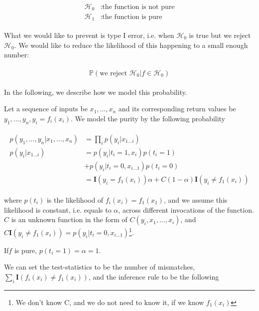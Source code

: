 \documentclass[]{article}
\begin{document}
\begin{align}
    \begin{split}    
    \mathcal{H}_0&: \text{the function is not pure} \\
    \mathcal{H}_1&: \text{the function is pure}
    \end{split}
\end{align}

What we would like to prevent is type I error, i.e. when $\mathcal{H}_0$ is 
true but we reject $\mathcal{H}_0$. We would like to reduce the likelihood of 
this happening to a small enough number:

\begin{align}
    \begin{split}
    \mathbb{P}(\text{we reject } \mathcal{H}_0 | f\in\mathcal{H}_0)
    \end{split}
\end{align}

In the following, we describe how we model this probability. 

Let a sequence of inputs be $x_1, ... , x_n$ and its corresponding return 
values be $y_1, ... , y_n, y_i = f_i(x_i)$. We model the purity by the 
following probability

\begin{align}
    \begin{split}
    p(y_1, ... , y_n | x_1, ..., x_n ) &= \prod_{i}p(y_i|x_{1...i})\\
    p(y_i|x_{1...i}) &= p(y_i| t_i = 1, x_i) p(t_i = 1) \\&+ p(y_i | t_i = 0, 
    x_{i...1}) p(t_i = 0) \\
    &=\mathbf{I}(y_i=f_1(x_i))\alpha + C(1-\alpha)\mathbf{I}(y_i\neq f_1(x_i))
    \end{split}
\end{align}

where $p(t_i)$ is the likelihood of $f_i(x_i) = f_1(x_1)$, and we assume this 
likelihood is constant, i.e. equals to $\alpha$, across different invocations 
of the function. $C$ is an unknown function in the form of $C(y_i, x_1, ..., 
x_i)$, and $C\mathbf{I}(y_i\neq f_1(x_i)) = p(y_i | t_i = 0, 
x_{i...1})$\footnote{We don't know C, and we do not need to know it, if we know 
$f_1(x_i)$}.

If$f$ is pure, $p(t_i=1)=\alpha=1$. 

We can set the test-statistics to be the number of mismatches, 
$\sum_{i}\mathbf{I}(f_i(x_i) \ne f_1(x_i))$, and the inference rule to be the 
following
\end{document}
